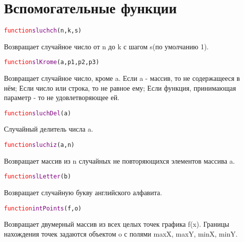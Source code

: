 \documentclass[a4paper,12pt]{article}
\begin{document}
	\section{Вспомогательные функции}
		\begin{alltt} 	
			\textcolor{Red}{function} \textcolor{Purple}{sluchch}(n,k,s)
		\end{alltt}
	Возвращает случайное число от n до k с шагом s(по умолчанию 1).
		\begin{alltt} 	
			\textcolor{Red}{function} \textcolor{Purple}{slKrome}(a,p1,p2,p3)
		\end{alltt}
	Возвращает случайное число, кроме a. Если a \-- массив, то не содержащееся в нём; Если число или строка, то не равное ему; Если функция, принимающая параметр - то не удовлетворяющее ей.
		\begin{alltt} 	
			\textcolor{Red}{function} \textcolor{Purple}{sluchDel}(a)
		\end{alltt}
	Случайный делитель числа a.
		\begin{alltt} 	
			\textcolor{Red}{function} \textcolor{Purple}{sluchiz}(a,n)
		\end{alltt}
	Возвращает массив из n случайных не повторяющихся элементов массива a. 
		\begin{alltt} 	
			\textcolor{Red}{function} \textcolor{Purple}{slLetter}(b)
		\end{alltt}
	Возвращает случайную букву английского алфавита.
		\begin{alltt} 	
			\textcolor{Red}{function} \textcolor{Purple}{intPoints}(f,o)
		\end{alltt}
  	Возвращает двумерный массив из всех целых точек графика f(x).  Границы нахождения точек задаются объектом o с полями maxX, maxY, minX, minY.
  	
\end{document}
